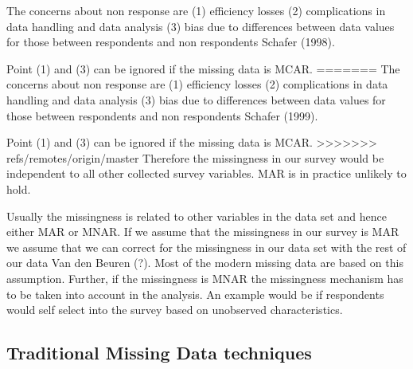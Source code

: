 The concerns about non response are (1) efficiency losses (2) complications in data handling and data analysis (3) bias due to differences between data values for those between respondents and non respondents  Schafer (1998). \par 
Point (1) and (3) can be ignored if the missing data is MCAR. 
=======
The concerns about non response are (1) efficiency losses (2) complications in data handling and data analysis (3) bias due to differences between data values for those between respondents and non respondents  Schafer (1999). \par 
Point (1) and (3)  can be ignored if the missing data is MCAR. 
>>>>>>> refs/remotes/origin/master
Therefore the missingness in our survey would be independent to all other collected survey variables. MAR is in practice unlikely to hold. \par 
Usually the missingness is related to other variables in the data set and hence either MAR or MNAR. 
If we assume that the missingness in our survey is  MAR we assume that we can correct for the missingness in our data set with the rest of our data Van den Beuren (?).  Most of the modern missing data are based on this assumption. Further, if the missingness is MNAR the missingness mechanism has to be taken into account in the analysis. An example would be if respondents would self select into the survey based on unobserved characteristics. 

\subsection{Traditional Missing Data techniques} 

